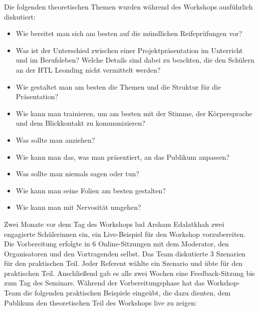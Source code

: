 Die folgenden theoretischen Themen wurden während des Workshops ausführlich diskutiert:


\begin{itemize}
    \item {Wie bereitet man sich am besten auf die mündlichen Reifeprüfungen vor?}
    \item {Was ist der Unterschied zwischen einer Projektpräsentation im Unterricht und im Berufsleben? Welche Details sind dabei zu beachten, die den Schülern an der HTL Leonding nicht vermittelt werden?}
    \item {Wie gestaltet man am besten die Themen und die Struktur für die Präsentation?}
    \item {Wie kann man trainieren, um am besten mit der Stimme, der Körpersprache und dem Blickkontakt zu kommunizieren?}
    \item {Was sollte man anziehen?}
    \item {Wie kann man das, was man präsentiert, an das Publikum anpassen?}
    \item {Was sollte man niemals sagen oder tun?}
    \item {Wie kann man seine Folien am besten gestalten?}
    \item {Wie kann man mit Nervosität umgehen?}
\end{itemize}

Zwei Monate vor dem Tag des Workshops lud Arsham Edalatkhah zwei engagierte Schülerinnen ein, ein Live-Beispiel für den Workshop vorzubereiten. Die Vorbereitung erfolgte in 6 Online-Sitzungen mit dem Moderator, den Organisatoren und den Vortragenden selbst. Das Team diskutierte 3 Szenarien für den praktischen Teil. Jeder Referent wählte ein Szenario und übte für den praktischen Teil. Anschließend gab es alle zwei Wochen eine Feedback-Sitzung bis zum Tag des Seminars. Während der Vorbereitungsphase hat das Workshop-Team die folgenden praktischen Beispiele eingeübt, die dazu dienten, dem Publikum den theoretischen Teil des Workshops live zu zeigen:

